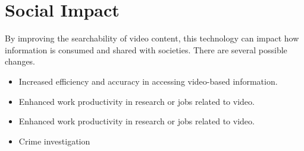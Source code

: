 \documentclass[11pt]{article}
\begin{document}
\section{Social Impact}
By improving the searchability of video content, this technology can impact how information is consumed and shared with societies. There are several possible changes.  

\begin{itemize}
    \item Increased efficiency and accuracy in accessing video-based information. 
    \item Enhanced work productivity in research or jobs related to video. 
    \item Enhanced work productivity in research or jobs related to video. 
    \item Crime investigation  
\end{itemize}
\end{document}
